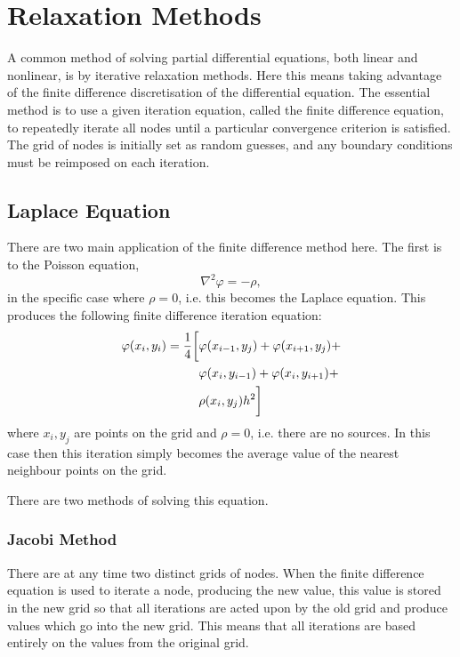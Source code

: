 \section{Relaxation Methods}
\label{sec:relaxation_methods}

A common method of solving partial differential equations, both linear and nonlinear, is by iterative relaxation methods. Here this means taking advantage of the finite difference discretisation of the differential equation. The essential method is to use a given iteration equation, called the finite difference equation, to repeatedly iterate all nodes until a particular convergence criterion is satisfied. The grid of nodes is initially set as random guesses, and any boundary conditions must be reimposed on each iteration.

\subsection{Laplace Equation}
There are two main application of the finite difference method here. The first is to the Poisson equation,
\begin{equation}
    \nabla^2 \varphi = -\rho,
    \label{eqn:poisson}
\end{equation} in the specific case where $\rho = 0$, i.e. this becomes the Laplace equation. This produces the following finite difference iteration equation:
\begin{align}
    \varphi(x_i,y_i) = \frac{1}{4}\bigg[&\varphi(x_{i-1},y_j)+\varphi(x_{i+1},y_j)+ \notag \\
        & \varphi(x_i,y_{i-1})+\varphi(x_i,y_{i+1})+ \label{eqn:iteration} \\
        & \rho(x_i,y_j)h^2\bigg] \notag
\end{align}
where $x_i,y_j$ are points on the grid and $\rho = 0$, i.e. there are no sources. In this case then this iteration simply becomes the average value of the nearest neighbour points on the grid.

There are two methods of solving this equation.

\subsubsection{Jacobi Method}
\label{subsubsec:jacobi}

There are at any time two distinct grids of nodes. When the finite difference equation is used to iterate a node, producing the new value, this value is stored in the new grid so that all iterations are acted upon by the old grid and produce values which go into the new grid. This means that all iterations are based entirely on the values from the original grid.

